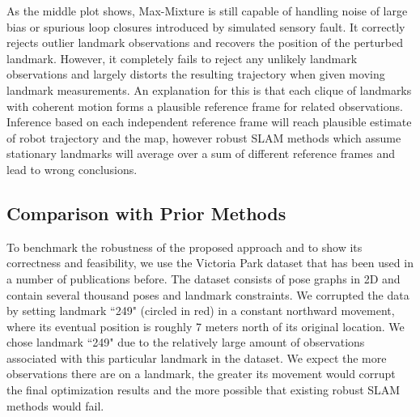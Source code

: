 As the middle plot shows, Max-Mixture is still capable of handling noise of
large bias or spurious loop closures introduced by simulated sensory fault. It
correctly rejects outlier landmark observations and recovers the position of
the perturbed landmark. However, it completely fails to reject any unlikely
landmark observations and largely distorts the resulting trajectory when given
moving landmark measurements. An explanation for this is that each clique of
landmarks with coherent motion forms a plausible reference frame for related
observations. Inference based on each independent reference frame will reach
plausible estimate of robot trajectory and the map, however robust SLAM methods
which assume stationary landmarks will average over a sum of different
reference frames and lead to wrong conclusions.

\subsection{Comparison with Prior Methods}

To benchmark the robustness of the proposed approach and to show its
correctness and feasibility, we use the Victoria Park dataset that has been
used in a number of publications before. The dataset consists of pose graphs in
2D and contain several thousand poses and landmark constraints. We corrupted
the data by setting landmark ``249" (circled in red) in a constant northward
movement, where its eventual position is roughly 7 meters north of its original
location. We chose landmark ``249" due to the relatively large amount of
observations associated with this particular landmark in the dataset. We expect
the more observations there are on a landmark, the greater its movement would
corrupt the final optimization results and the more possible that existing
robust SLAM methods would fail.

